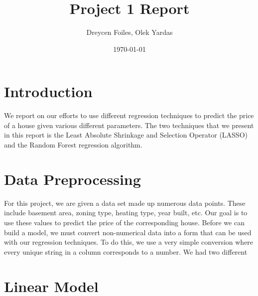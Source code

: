 \documentclass{article}
\title{Project 1 Report}
\author{Dreycen Foiles, Olek Yardas}
\date{\today}
\begin{document}
\maketitle

\section{Introduction}

We report on our efforts to use different regression techniques to predict the price of a house given various different parameters. The two techniques that we present in this report is the Least Absolute Shrinkage and Selection Operator (LASSO) and the Random Forest regression algorithm.

\section{Data Preprocessing}

For this project, we are given a data set made up numerous data points. These include basement area, zoning type, heating type, year built, etc. Our goal is to use these values to predict the price of the corresponding house. Before we can build a model, we must convert non-numerical data into a form that can be used with our regression techniques. To do this, we use a very simple conversion where every unique string in a column corresponds to a number. We had two different 

\section{Linear Model}
\end{document}
